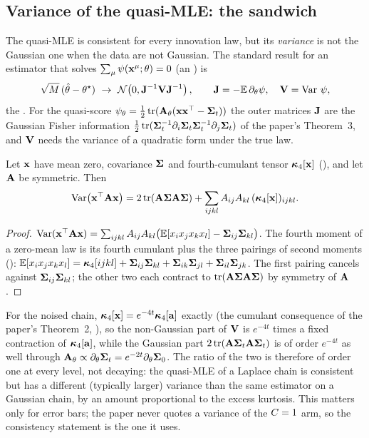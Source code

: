 \subsection{Variance of the quasi-MLE: the sandwich}
\label{sec:ql-sandwich}

The quasi-MLE is consistent for every innovation law, but its \emph{variance} is not the
Gaussian one when the data are not Gaussian. The standard result for an estimator that
solves $\sum_\mu\psi(\mathbf{x}^\mu;\theta)=0$ (an ) is
\begin{equation}
  \sqrt{\nseq}\,(\hat\params-\params^\star)\ \to\ \normal{0}{\mat{J}^{-1}\mat{V}\mat{J}^{-1}},
  \qquad \mat{J}=-\E\,\partial_\params\psi,\quad \mat{V}=\Var\,\psi ,
  \label{eq:sandwich}
\end{equation}
the . For the quasi-score $\psi_\theta=\tfrac12\operatorname{tr}(\mathbf{A}_\theta(\mathbf{x}\mathbf{x}^\top-\mathbf{\Sigma}_t))$
the outer matrices $\mathbf{J}$ are the Gaussian Fisher information
$\tfrac12\operatorname{tr}(\mathbf{\Sigma}_t^{-1}\partial_i\mathbf{\Sigma}_t\mathbf{\Sigma}_t^{-1}\partial_j\mathbf{\Sigma}_t)$ of the paper's
Theorem~3, and $\mathbf{V}$ needs the variance of a quadratic form under the true law.

\begin{lemma}
\label{lem:quadform}
Let $\mathbf{x}$ have mean zero, covariance $\mathbf{\Sigma}$ and fourth-cumulant tensor $\bm{\kappa}_4[\mathbf{x}]$
(), and let $\mathbf{A}$ be symmetric. Then
\begin{equation}
  \operatorname{Var}\bigl(\mathbf{x}^\top\mathbf{A}\mathbf{x}\bigr)=2\operatorname{tr}(\mathbf{A}\mathbf{\Sigma}\mathbf{A}\mathbf{\Sigma})+\sum_{ijkl}A_{ij}A_{kl}\,(\bm{\kappa}_4[\mathbf{x}])_{ijkl}.
\end{equation}
\end{lemma}
\begin{proof}
$\operatorname{Var}(\mathbf{x}^\top\mathbf{A}\mathbf{x})=\sum_{ijkl}A_{ij}A_{kl}\bigl(\mathbb{E}[x_ix_jx_kx_l]-\mathbf{\Sigma}_{ij}\mathbf{\Sigma}_{kl}\bigr)$.
The fourth moment of a zero-mean law is its fourth cumulant plus the three pairings of
second moments ():
$\mathbb{E}[x_ix_jx_kx_l]=\bm{\kappa}_4[ijkl]+\mathbf{\Sigma}_{ij}\mathbf{\Sigma}_{kl}+\mathbf{\Sigma}_{ik}\mathbf{\Sigma}_{jl}+\mathbf{\Sigma}_{il}\mathbf{\Sigma}_{jk}$.
The first pairing cancels against $\mathbf{\Sigma}_{ij}\mathbf{\Sigma}_{kl}$; the other two each contract to
$\operatorname{tr}(\mathbf{A}\mathbf{\Sigma}\mathbf{A}\mathbf{\Sigma})$ by symmetry of $\mathbf{A}$.
\end{proof}

For the noised chain, $\bm{\kappa}_4[\mathbf{x}]=e^{-4t}\bm{\kappa}_4[\mathbf{a}]$ exactly (the cumulant consequence
of the paper's Theorem~2, ), so the non-Gaussian part of
$\mathbf{V}$ is $e^{-4t}$ times a fixed contraction of $\bm{\kappa}_4[\mathbf{a}]$, while the Gaussian part
$2\operatorname{tr}(\mathbf{A}\mathbf{\Sigma}_t\mathbf{A}\mathbf{\Sigma}_t)$ is of order $e^{-4t}$ as well through
$\mathbf{A}_\theta\propto\partial_\theta\mathbf{\Sigma}_t=e^{-2t}\partial_\theta\mathbf{\Sigma}_0$. The ratio of
the two is therefore of order one at every level, not decaying: the quasi-MLE of a
Laplace chain is consistent but has a different (typically larger) variance than the
same estimator on a Gaussian chain, by an amount proportional to the excess kurtosis.
This matters only for error bars; the paper never quotes a variance of the
$C=1$ arm, so the consistency statement is the one it uses.

